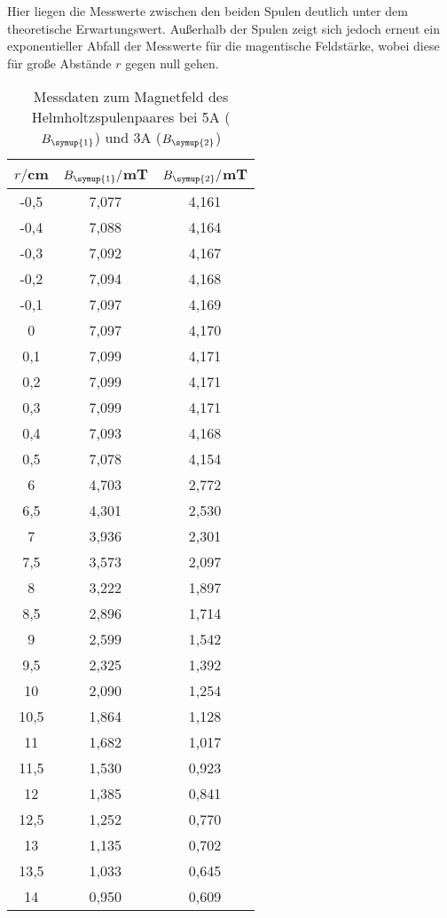 Hier liegen die Messwerte zwischen den beiden Spulen deutlich unter dem
theoretische Erwartungswert. Außerhalb der Spulen zeigt sich jedoch erneut ein
exponentieller Abfall der Messwerte für die magentische Feldstärke, wobei diese für
große Abstände $r$ gegen null gehen.


\begin{table}
  \centering
  \caption{Messdaten zum Magnetfeld des Helmholtzspulenpaares bei 5A ($B_{\symup{1}}$)
  und 3A ($B_{\symup{2}}$)}
  \label{tab:helmholtz}
  \begin{tabular}{c c c}
    \toprule
    $r/$cm & $B_{\symup{1}}/$mT & $B_{\symup{2}}/$mT\\
    \midrule
    -0,5	&  7,077 & 4,161\\
    -0,4	&  7,088 & 4,164\\
    -0,3	&  7,092 & 4,167\\
    -0,2	&  7,094 & 4,168\\
    -0,1	&  7,097 & 4,169\\
    0	    &  7,097 & 4,170\\
    0,1	  &  7,099 & 4,171\\
    0,2	  &  7,099 & 4,171\\
    0,3	  &  7,099 & 4,171\\
    0,4	  &  7,093 & 4,168\\
    0,5	  &  7,078 & 4,154\\
    6	    &  4,703 & 2,772\\
    6,5	  &  4,301 & 2,530\\
    7	    &  3,936 & 2,301\\
    7,5	  &  3,573 & 2,097\\
    8	    &  3,222 & 1,897\\
    8,5	  &  2,896 & 1,714\\
    9	    &  2,599 & 1,542\\
    9,5 	&  2,325 & 1,392\\
    10	  &  2,090 & 1,254\\
    10,5	&  1,864 & 1,128\\
    11	  &  1,682 & 1,017\\
    11,5	&  1,530 & 0,923\\
    12	  &  1,385 & 0,841\\
    12,5	&  1,252 & 0,770\\
    13	  &  1,135 & 0,702\\
    13,5	&  1,033 & 0,645\\
    14	  &  0,950 & 0,609\\

\end{tabular}
\end{table}
